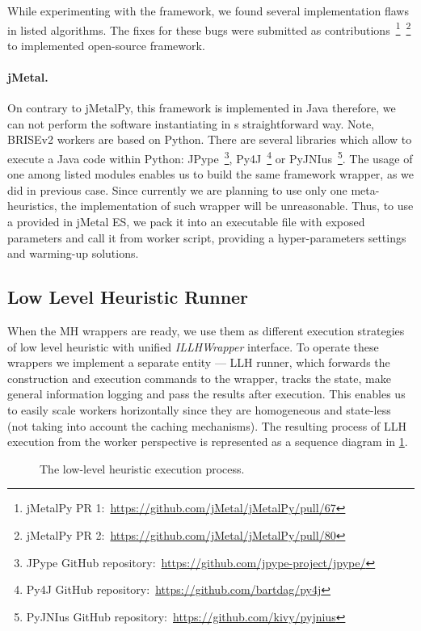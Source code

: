 While experimenting with the framework, we found several implementation flaws in listed algorithms. The fixes for these bugs were submitted as contributions~\footnote{jMetalPy PR 1:~\url{https://github.com/jMetal/jMetalPy/pull/67}}~\footnote{jMetalPy PR 2:~\url{https://github.com/jMetal/jMetalPy/pull/80}} to implemented open-source framework.

\paragraph{jMetal.} On contrary to jMetalPy, this framework is implemented in Java therefore, we can not perform the software instantiating in s straightforward way. Note, BRISEv2 workers are based on Python. There are several libraries which allow to execute a Java code within Python: JPype~\footnote{JPype GitHub repository:~\url{https://github.com/jpype-project/jpype/}}, Py4J~\footnote{Py4J GitHub repository:~\url{https://github.com/bartdag/py4j}} or PyJNIus~\footnote{PyJNIus GitHub repository:~\url{https://github.com/kivy/pyjnius}}. The usage of one among listed modules enables us to build the same framework wrapper, as we did in previous case. Since currently we are planning to use only one meta-heuristics, the implementation of such wrapper will be unreasonable. Thus, to use a provided in jMetal ES, we pack it into an executable file with exposed parameters and call it from worker script, providing a hyper-parameters settings and warming-up solutions.

\subsection{Low Level Heuristic Runner}
When the MH wrappers are ready, we use them as different execution strategies of low level heuristic with unified \emph{ILLHWrapper} interface. To operate these wrappers we implement a separate entity — LLH runner, which forwards the construction and execution commands to the wrapper, tracks the state, make general information logging and pass the results after execution. This enables us to easily scale workers horizontally since they are homogeneous and state-less (not taking into account the caching mechanisms). The resulting process of LLH execution from the worker perspective is represented as a sequence diagram in \cref{impl:pict:llh sequence diagram}.

\begin{figure}
	\centering
	
	\caption{The low-level heuristic execution process.}
	\label{impl:pict:llh sequence diagram}
\end{figure}

